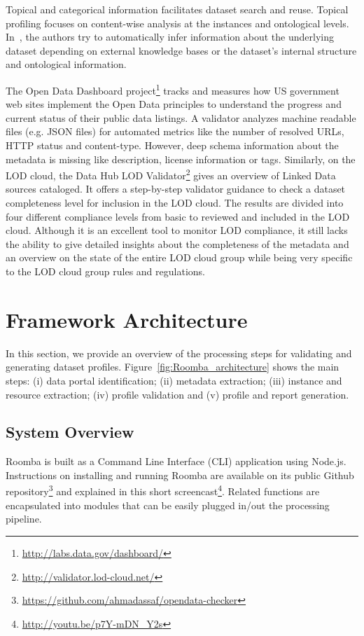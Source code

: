 \documentclass{../../Tools/LaTEX/sig-alternate}
\begin{document}
Topical and categorical information facilitates dataset search and reuse. Topical profiling focuses on content-wise analysis at the instances and ontological levels. In~\cite{Lalithsena:WI:13,Bohm:CIKM:12,Fetahu:ESWC:14}, the authors try to automatically infer information about the underlying dataset depending on external knowledge bases or the dataset's internal structure and ontological information.

The Open Data Dashboard project\footnote{\url{http://labs.data.gov/dashboard/}} tracks and measures how US government web sites implement the Open Data principles to understand the progress and current status of their public data listings. A validator analyzes machine readable files (e.g. JSON files) for automated metrics like the number of resolved URLs, HTTP status and content-type. However, deep schema information about the metadata is missing like description, license information or tags. Similarly, on the LOD cloud, the Data Hub LOD Validator\footnote{\url{http://validator.lod-cloud.net/}} gives an overview of Linked Data sources cataloged. It offers a step-by-step validator guidance to check a dataset completeness level for inclusion in the LOD cloud. The results are divided into four different compliance levels from basic to reviewed and included in the LOD cloud. Although it is an excellent tool to monitor LOD compliance, it still lacks the ability to give detailed insights about the completeness of the metadata and an overview on the state of the entire LOD cloud group while being very specific to the LOD cloud group rules and regulations.


\section{Framework Architecture}
\label{sec:framework}
In this section, we provide an overview of the processing steps for validating and generating dataset profiles. Figure~\ref{fig:Roomba_architecture} shows the main steps: (i) data portal identification; (ii) metadata extraction; (iii) instance and resource extraction; (iv) profile validation and (v) profile and report generation.

\subsection{System Overview}
Roomba is built as a Command Line Interface (CLI) application using Node.js. Instructions on installing and running Roomba are available on its public Github repository\footnote{\url{https://github.com/ahmadassaf/opendata-checker}} and explained in this short screencast\footnote{\url{http://youtu.be/p7Y-mDN_Y2s}}. Related functions are encapsulated into modules that can be easily plugged in/out the processing pipeline.
\end{document}

